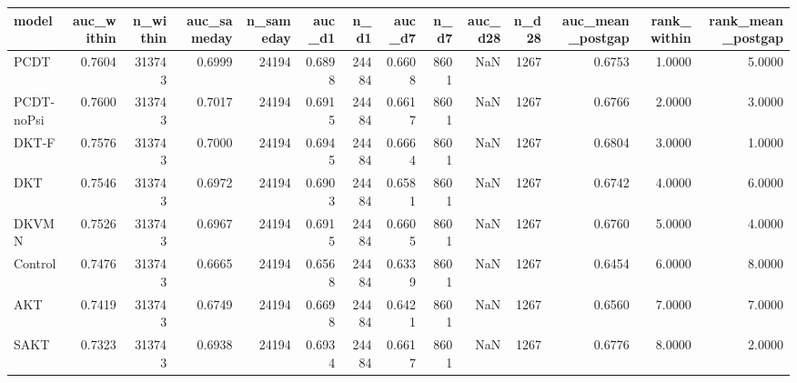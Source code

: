 \begin{tabular}{lrrrrrrrrrrrrr}
\toprule
model & auc\_within & n\_within & auc\_sameday & n\_sameday & auc\_d1 & n\_d1 & auc\_d7 & n\_d7 & auc\_d28 & n\_d28 & auc\_mean\_postgap & rank\_within & rank\_mean\_postgap \\
\midrule
PCDT & 0.7604 & 313743 & 0.6999 & 24194 & 0.6898 & 24484 & 0.6608 & 8601 & NaN & 1267 & 0.6753 & 1.0000 & 5.0000 \\
PCDT-noPsi & 0.7600 & 313743 & 0.7017 & 24194 & 0.6915 & 24484 & 0.6617 & 8601 & NaN & 1267 & 0.6766 & 2.0000 & 3.0000 \\
DKT-F & 0.7576 & 313743 & 0.7000 & 24194 & 0.6945 & 24484 & 0.6664 & 8601 & NaN & 1267 & 0.6804 & 3.0000 & 1.0000 \\
DKT & 0.7546 & 313743 & 0.6972 & 24194 & 0.6903 & 24484 & 0.6581 & 8601 & NaN & 1267 & 0.6742 & 4.0000 & 6.0000 \\
DKVMN & 0.7526 & 313743 & 0.6967 & 24194 & 0.6915 & 24484 & 0.6605 & 8601 & NaN & 1267 & 0.6760 & 5.0000 & 4.0000 \\
Control & 0.7476 & 313743 & 0.6665 & 24194 & 0.6568 & 24484 & 0.6339 & 8601 & NaN & 1267 & 0.6454 & 6.0000 & 8.0000 \\
AKT & 0.7419 & 313743 & 0.6749 & 24194 & 0.6698 & 24484 & 0.6421 & 8601 & NaN & 1267 & 0.6560 & 7.0000 & 7.0000 \\
SAKT & 0.7323 & 313743 & 0.6938 & 24194 & 0.6934 & 24484 & 0.6617 & 8601 & NaN & 1267 & 0.6776 & 8.0000 & 2.0000 \\
\bottomrule
\end{tabular}
